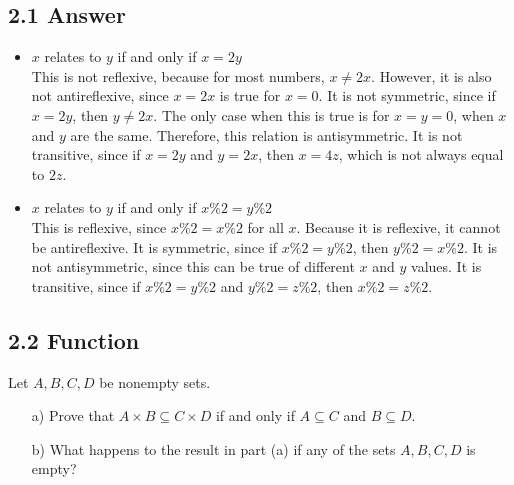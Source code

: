 \documentclass{article}
\begin{document}
\subsection*{2.1 Answer}
\begin{itemize}
    \item $x$ relates to $y$ if and only if $x=2y$
    \\ This is not reflexive, because for most numbers, $x\neq 2x$. However, it is also not antireflexive, since $x=2x$ is true for $x=0$. It is not symmetric, since if $x=2y$, then $y\neq2x$. The only case when this is true is for $x=y=0$, when $x$ and $y$ are the same. Therefore, this relation is antisymmetric. It is not transitive, since if $x=2y$ and $y=2x$, then $x=4z$, which is not always equal to $2z$.
    \item $x$ relates to $y$ if and only if $x\%2=y\%2$
    \\ This is reflexive, since $x\%2=x\%2$ for all $x$. Because it is reflexive, it cannot be antireflexive. It is symmetric, since if $x\%2=y\%2$, then   $y\%2=x\%2$. It is not antisymmetric, since this can be true of different $x$ and $y$ values. It is transitive, since if $x\%2=y\%2$ and $y\%2=z\%2$, then $x\%2=z\%2$.
\end{itemize}
\newpage
\subsection*{2.2 Function}
Let \( A, B, C, D \) be nonempty sets.
\begin{enumerate}
    \item[a)] Prove that \( A \times B \subseteq C \times D \) if and only if \( A \subseteq C \) and \( B \subseteq D \).
    \item[b)] What happens to the result in part (a) if any of the sets \( A, B, C, D \) is empty?
\end{enumerate}
\newpage
\end{document}
